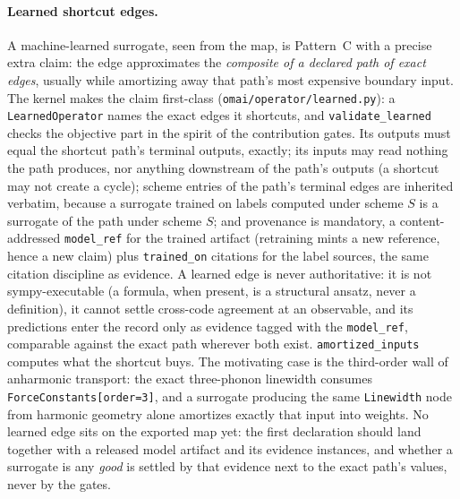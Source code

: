 \documentclass[11pt,a4paper]{article}
\begin{document}
\paragraph{Learned shortcut edges.} A machine-learned surrogate, seen from
the map, is Pattern~C with a precise extra claim: the edge approximates the
\emph{composite of a declared path of exact edges}, usually while amortizing
away that path's most expensive boundary input. The kernel makes the claim
first-class (\texttt{omai/operator/learned.py}): a \texttt{LearnedOperator}
names the exact edges it shortcuts, and \texttt{validate\_learned} checks the
objective part in the spirit of the contribution gates. Its outputs must equal
the shortcut path's terminal outputs, exactly; its inputs may read nothing the
path produces, nor anything downstream of the path's outputs (a shortcut may
not create a cycle); scheme entries of the path's terminal edges are inherited
verbatim, because a surrogate trained on labels computed under scheme $S$ is a
surrogate of the path under scheme $S$; and provenance is mandatory, a
content-addressed \texttt{model\_ref} for the trained artifact (retraining
mints a new reference, hence a new claim) plus \texttt{trained\_on} citations
for the label sources, the same citation discipline as evidence. A learned
edge is never authoritative: it is not sympy-executable (a formula, when
present, is a structural ansatz, never a definition), it cannot settle
cross-code agreement at an observable, and its predictions enter the record
only as evidence tagged with the \texttt{model\_ref}, comparable against the
exact path wherever both exist. \texttt{amortized\_inputs} computes what the
shortcut buys. The motivating case is the third-order wall of anharmonic
transport: the exact three-phonon linewidth consumes
\texttt{ForceConstants[order=3]}, and a surrogate producing the same
\texttt{Linewidth} node from harmonic geometry alone amortizes exactly that
input into weights. No learned edge sits on the exported map yet: the first
declaration should land together with a released model artifact and its
evidence instances, and whether a surrogate is any \emph{good} is settled by
that evidence next to the exact path's values, never by the gates.
\end{document}
